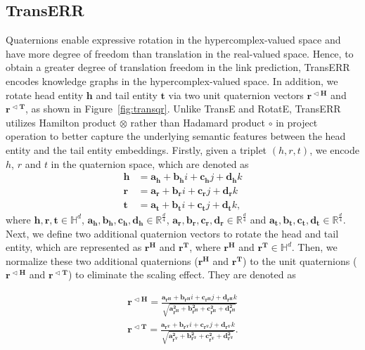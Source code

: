 \documentclass[10pt, a4paper]{article}
\begin{document}
\subsection{TransERR}\label{sec4.1}
Quaternions enable expressive rotation in the hypercomplex-valued space and have more degree of freedom than translation in the real-valued space. Hence, to obtain a greater degree of translation freedom in the link prediction, TransERR encodes knowledge graphs in the hypercomplex-valued space. In addition, we rotate head entity $\mathbf{h}$ and tail entity $\mathbf{t}$ via two unit quaternion vectors $\mathbf{r^{\vartriangleleft H}}$ and $\mathbf{r^{\vartriangleleft T}}$, as shown in Figure~\ref{fig:transqr}. Unlike TransE and RotatE, TransERR utilizes Hamilton product $\otimes$ rather than Hadamard product $\circ$ in project operation to better capture  the underlying semantic features between the head entity and the tail entity embeddings. Firstly, given a triplet $(h,r,t)$, we encode $h$, $r$ and $t$ in the quaternion space, which are denoted as
\begin{equation}
	\begin{aligned}
		\mathbf{h} & = \mathbf{a_h}+\mathbf{b_h}i+\mathbf{c_h}j+\mathbf{d_h}k   \\
		\mathbf{r} & = \mathbf{a_r}+\mathbf{b_r}i+\mathbf{c_r}j+\mathbf{d_r}k   \\
		\mathbf{t} & = \mathbf{a_t}+\mathbf{b_t}i+\mathbf{c_t}j+\mathbf{d_t}k,
	\end{aligned}
\end{equation}
where $\mathbf{h},\mathbf{r},\mathbf{t} \in\mathbb{H}^{d}$, $\mathbf{a_h},\mathbf{b_h}, \mathbf{c_h}, \mathbf{d_h} \in \mathbb{R}^{\frac{d}{4}}$, $\mathbf{a_r},\mathbf{b_r}, \mathbf{c_r}, \mathbf{d_r} \in \mathbb{R}^{\frac{d}{4}}$ and $\mathbf{a_t},\mathbf{b_t}, \mathbf{c_t}, \mathbf{d_t} \in \mathbb{R}^{\frac{d}{4}}$. Next, we define two additional quaternion vectors to  rotate the head and tail entity, which are represented as $\mathbf{r^H}$ and $\mathbf{r^T}$, where $\mathbf{r^H}$ and $\mathbf{r^T} \in\mathbb{H}^{d}$. Then, we normalize these two additional quaternions ($\mathbf{r^H}$ and $\mathbf{r^T}$) to the unit quaternions ($\mathbf{r^{\vartriangleleft H}}$ and $\mathbf{r^{\vartriangleleft T}}$) to eliminate the scaling effect. They are denoted as


\begin{equation}
	\begin{aligned}
		\mathbf{r^{\vartriangleleft H}}=\frac{\mathbf{a_{r^H}}+\mathbf{b_{r^H}}i+\mathbf{c_{r^H}}j+\mathbf{d_{r^H}}k}{\sqrt{\mathbf{a_{r^H}^2}+\mathbf{b_{r^H}^2}+\mathbf{c_{r^H}^2}+\mathbf{d_{r^H}^2}}} \\
		\mathbf{r^{\vartriangleleft T}}=\frac{\mathbf{a_{r^T}}+\mathbf{b_{r^T}}i+\mathbf{c_{r^T}}j+\mathbf{d_{r^T}}k}{\sqrt{\mathbf{a_{r^T}^2}+\mathbf{b_{r^T}^2}+\mathbf{c_{r^T}^2}+\mathbf{d_{r^T}^2}}}.
	\end{aligned}
\end{equation}
\end{document}
